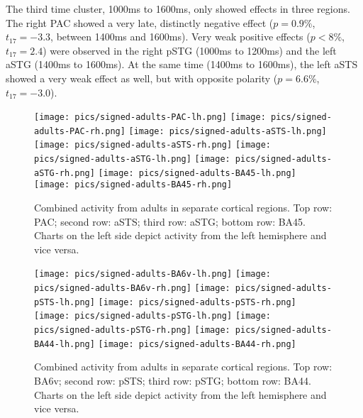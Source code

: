 The third time cluster, 1000ms to 1600ms, only showed effects in three regions.
The right PAC showed a very late, distinctly negative effect ($p = 0.9\%$, $t_{17} = -3.3$, between 1400ms and 1600ms).
Very weak positive effects ($p < 8\%$, $t_{17} = 2.4$) were observed in the right pSTG (1000ms to 1200ms) and the left aSTG (1400ms to 1600ms).
At the same time (1400ms to 1600ms), the left aSTS showed a very weak effect as well, but with opposite polarity ($p = 6.6\%$, $t_{17} = -3.0$).

\begin{figure}[h]
\begin{center}
\texttt{[image: pics/signed-adults-PAC-lh.png]}
\texttt{[image: pics/signed-adults-PAC-rh.png]}
\texttt{[image: pics/signed-adults-aSTS-lh.png]}
\texttt{[image: pics/signed-adults-aSTS-rh.png]}
\texttt{[image: pics/signed-adults-aSTG-lh.png]}
\texttt{[image: pics/signed-adults-aSTG-rh.png]}
\texttt{[image: pics/signed-adults-BA45-lh.png]}
\texttt{[image: pics/signed-adults-BA45-rh.png]}
\caption{\label{4.3.activity.adults.ventral} Combined activity from adults in separate cortical regions. Top row: PAC; second row: aSTS; third row: aSTG; bottom row: BA45. Charts on the left side depict activity from the left hemisphere and vice versa.}
\end{center}
\end{figure}


\begin{figure}[h]
\begin{center}
\texttt{[image: pics/signed-adults-BA6v-lh.png]}
\texttt{[image: pics/signed-adults-BA6v-rh.png]}
\texttt{[image: pics/signed-adults-pSTS-lh.png]}
\texttt{[image: pics/signed-adults-pSTS-rh.png]}
\texttt{[image: pics/signed-adults-pSTG-lh.png]}
\texttt{[image: pics/signed-adults-pSTG-rh.png]}
\texttt{[image: pics/signed-adults-BA44-lh.png]}
\texttt{[image: pics/signed-adults-BA44-rh.png]}
\caption{\label{4.3.activity.adults.ventral} Combined activity from adults in separate cortical regions. Top row: BA6v; second row: pSTS; third row: pSTG; bottom row: BA44. Charts on the left side depict activity from the left hemisphere and vice versa.}
\end{center}
\end{figure}

